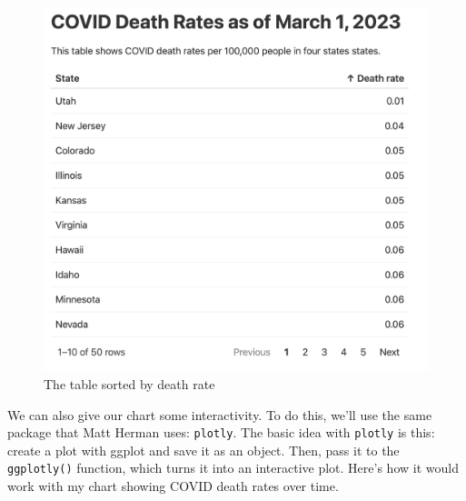 \documentclass[
]{book}
\begin{document}
\begin{figure}
\includegraphics[width=1\linewidth]{assets/covid-website-reactable-sorted} \caption{The table sorted by death rate}\label{fig:covid-website-reactable-sorted}
\end{figure}

We can also give our chart some interactivity. To do this, we'll use the same package that Matt Herman uses: \texttt{plotly}. The basic idea with \texttt{plotly} is this: create a plot with ggplot and save it as an object. Then, pass it to the \texttt{ggplotly()} function, which turns it into an interactive plot. Here's how it would work with my chart showing COVID death rates over time.
\end{document}
